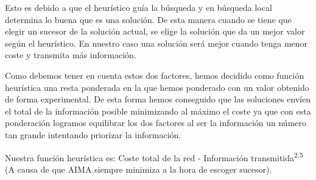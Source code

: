 \documentclass{article}
\begin{document}
\begin{enumerate}
  Esto es debido a que el heurístico guía la búsqueda y en búsqueda local determina lo buena que es una solución. De esta manera cuando se tiene que elegir un sucesor de la solución actual, se elige la solución que da un mejor valor según el heurístico. En nuestro caso una solución será mejor cuando tenga menor coste y transmita más información.\par
  Como debemos tener en cuenta estos dos factores, hemos decidido como función heurística una resta ponderada en la que hemos ponderado con un valor obtenido de forma experimental. De esta forma hemos conseguido que las soluciones envíen el total de la información posible minimizando al máximo el coste ya que con esta ponderación logramos equilibrar los dos factores al ser la información un número tan grande intentando priorizar la información.\par
  Nuestra función heurística es: Coste total de la red - Información transmitida\textsuperscript{2.5} (A causa de que AIMA siempre minimiza a la hora de escoger sucesor).

\end{enumerate}

\newpage
\end{document}
